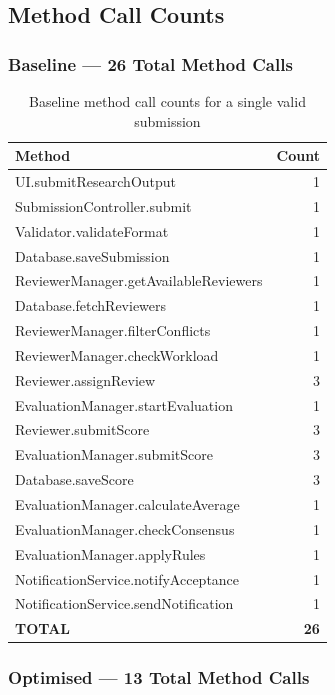 \documentclass[12pt, a4paper]{article}
\begin{document}
\subsection{Method Call Counts}

\subsubsection{Baseline --- 26 Total Method Calls}

\begin{table}[h]
\centering
\caption{Baseline method call counts for a single valid submission}
\label{tab:baseline-calls}
\begin{tabular}{l r}
    \toprule
    \textbf{Method} & \textbf{Count} \\
    \midrule
    UI.submitResearchOutput & 1 \\
    SubmissionController.submit & 1 \\
    Validator.validateFormat & 1 \\
    Database.saveSubmission & 1 \\
    ReviewerManager.getAvailableReviewers & 1 \\
    Database.fetchReviewers & 1 \\
    ReviewerManager.filterConflicts & 1 \\
    ReviewerManager.checkWorkload & 1 \\
    Reviewer.assignReview & 3 \\
    EvaluationManager.startEvaluation & 1 \\
    Reviewer.submitScore & 3 \\
    EvaluationManager.submitScore & 3 \\
    Database.saveScore & 3 \\
    EvaluationManager.calculateAverage & 1 \\
    EvaluationManager.checkConsensus & 1 \\
    EvaluationManager.applyRules & 1 \\
    NotificationService.notifyAcceptance & 1 \\
    NotificationService.sendNotification & 1 \\
    \midrule
    \textbf{TOTAL} & \textbf{26} \\
    \bottomrule
\end{tabular}
\end{table}

\subsubsection{Optimised --- 13 Total Method Calls}
\end{document}
